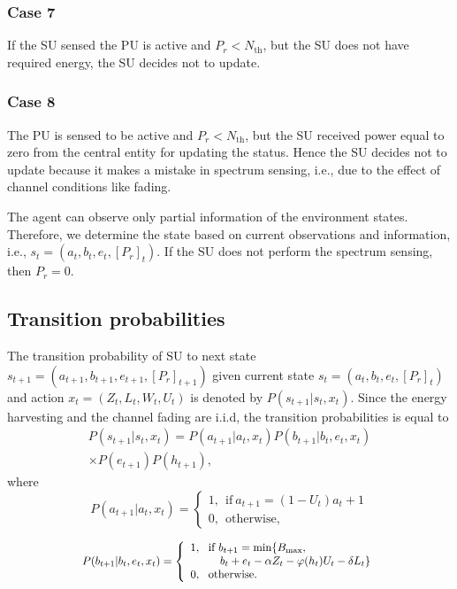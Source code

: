 \documentclass[journal]{IEEEtran}
\begin{document}
		\subsubsection{Case 7}
			If the SU sensed the PU is active and $P_r < N_{\text{th}}$, but the SU does not have required energy, the SU decides not to update.
		\subsubsection{Case 8}
			The PU is sensed to be active and $P_r < N_{\text{th}}$, but the SU received power equal to zero from the central entity for updating the status. Hence the SU decides not to update because it makes a mistake in spectrum sensing, i.e., due to the effect of channel conditions like fading.
			
		 The agent can observe only partial information of the environment states. Therefore, we determine the state based on current observations and information, i.e., $s_t = (a_t, b_t, e_t, {[{P_r}]_t})$. If the SU does not perform the spectrum sensing, then ${P_r} = 0$.
			
		\subsection{Transition probabilities}
			The transition probability of SU to next state $s_{t+1} = (a_{t+1}, b_{t+1}, e_{t+1}, {[{P_r}]_{t+1}})$ given current state $s_t = (a_t, b_t, e_t, {[{P_r}]_t})$ and action $x_t = (Z_t, L_t, W_t, U_t)$ is denoted by ${P}(s_{t+1} | s_t,{x_t})$. Since the energy harvesting and the channel fading are i.i.d, the transition probabilities is equal to
			\begin{equation}
				\begin{split}{P}({s_{t + 1}}|{s_t},{x_t}) = P({a_{t + 1}}|{a_t},{x_t})P({b_{t + 1}}|{b_t},{e_t},{x_t}) \\
				\times P({e_{t + 1}})P({h_{t + 1}}), \end{split}
			\end{equation}
			where
			\begin{equation}
				{P({a_{t + 1}}|{a_t},{x_t})} = \left\{ \begin{array}{l}
				1, ~~  \text{if}~{a_{t + 1}} = (1 - {U_t}){a_t} + 1\\
				0, ~~  \text{otherwise},
				\end{array} \right.
			\end{equation}

			\begin{equation}
				\scalebox{0.9} {$P({b_{t + 1}}|{b_t},{e_t},{x_t}) = \left\{ \begin{array}{l}
				1,~~\text{if}~{b_{t + 1}} = \min \{ {B_{\max }},\\
				~~~~~~~~{b_t} + {e_t} - \alpha {Z_t} - \varphi ({h_t}){U_t} - \delta {L_t}\} \\
				0,~~\text{otherwise}.
				\end{array} \right.$}
			\end{equation}
\end{document}

